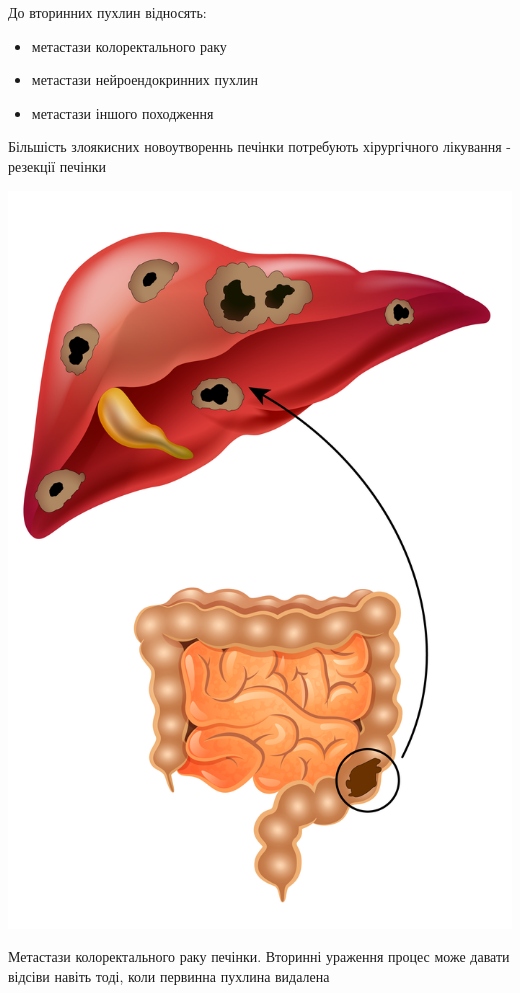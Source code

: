 До вторинних пухлин відносять:
\begin{itemize}
    \item метастази колоректального раку
    \item метастази нейроендокринних пухлин
    \item метастази іншого походження
\end{itemize}

Більшість злоякисних новоутвореннь печінки потребують хірургічного лікування - резекції печінки

\begin{marginfigure}[10pt]%
  \includegraphics[width=\linewidth]{Figures/CRLM.png}
  \caption{Метастази колоректального раку печінки. Вторинні ураження процес може давати відсіви навіть тоді, коли первинна пухлина видалена}
  \label{fig:crlm}
\end{marginfigure}

